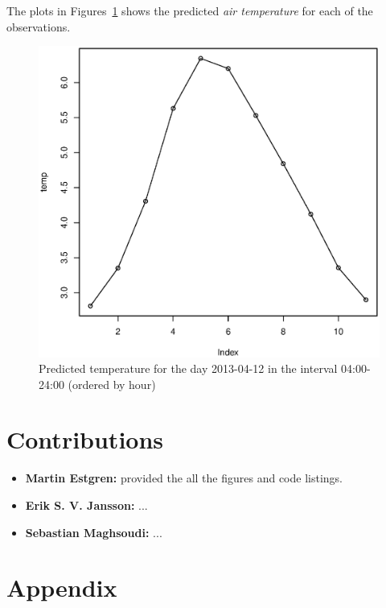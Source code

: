 \documentclass[a4paper, twocolumn]{article}
\begin{document}
    The plots in Figures~\ref{fig:result} shows the predicted \textit{air temperature} for each of the observations. 
    \begin{figure}[!h]
    \centering
    \caption{Predicted temperature for the day 2013-04-12 in the interval 04:00-24:00 (ordered by hour)\label{fig:result}}
	    \begin{minipage}[]{0.4\textwidth}
	    	\includegraphics[width=\textwidth]{share/result.eps}
	    \end{minipage}
    \end{figure}


    \section*{Contributions}

    \begin{itemize}
    	\item{\textbf{Martin Estgren:} provided the all the figures and code listings.}
    	\item{\textbf{Erik S. V. Jansson:} ...}
    	\item{\textbf{Sebastian Maghsoudi:} ...}
    \end{itemize}

    \nocite{*} %
    
    
    \onecolumn \appendix
    \section*{Appendix}
 	


    
\end{document}
